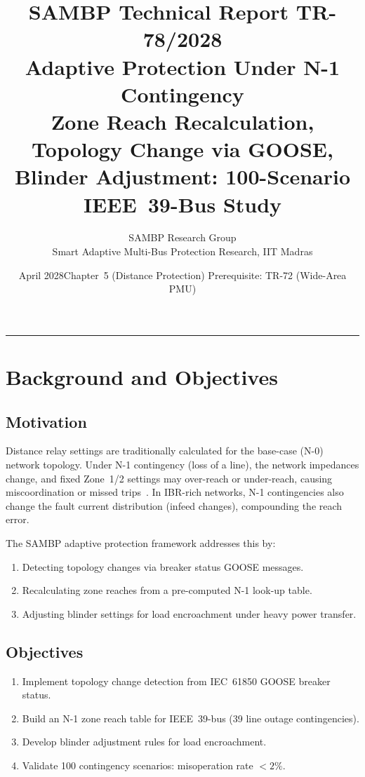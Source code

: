 \documentclass[11pt, a4paper]{article}
\title{\textbf{\textsf{\color{sambpblue}SAMBP Technical Report TR-78/2028}}\\[6pt]
  \Large Adaptive Protection Under N-1 Contingency\\[4pt]
  \normalsize Zone Reach Recalculation, Topology Change via GOOSE,
  Blinder Adjustment: 100-Scenario IEEE~39-Bus Study}
\author{SAMBP Research Group\\[2pt]
  \small Smart Adaptive Multi-Bus Protection Research, IIT Madras}
\date{April 2028\quad\textbar\quad Chapter~5 (Distance Protection)\quad\textbar\quad
  Prerequisite: TR-72 (Wide-Area PMU)}
\begin{document}
\maketitle
\tableofcontents
\vspace{6pt}\hrule\vspace{10pt}

\section{Background and Objectives}
\label{sec:background}

\subsection{Motivation}

Distance relay settings are traditionally calculated for the base-case (N-0)
network topology. Under N-1 contingency (loss of a line), the network impedances
change, and fixed Zone~1/2 settings may over-reach or under-reach, causing
miscoordination or missed trips~\cite{Horowitz2008}. In IBR-rich networks,
N-1 contingencies also change the fault current distribution (infeed changes),
compounding the reach error.

The SAMBP adaptive protection framework addresses this by:
\begin{enumerate}
  \item Detecting topology changes via breaker status GOOSE messages.
  \item Recalculating zone reaches from a pre-computed N-1 look-up table.
  \item Adjusting blinder settings for load encroachment under heavy power transfer.
\end{enumerate}

\subsection{Objectives}

\begin{enumerate}
  \item Implement topology change detection from IEC~61850 GOOSE breaker status.
  \item Build an N-1 zone reach table for IEEE~39-bus (39 line outage contingencies).
  \item Develop blinder adjustment rules for load encroachment.
  \item Validate 100 contingency scenarios: misoperation rate $< 2\%$.
\end{enumerate}
\end{document}
